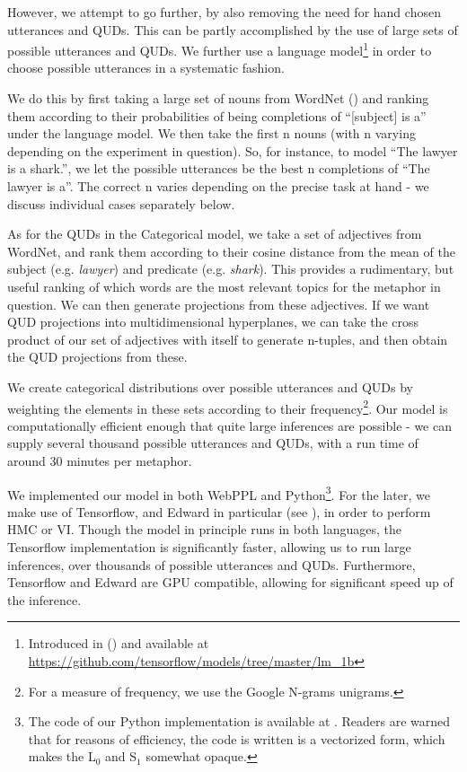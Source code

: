 \documentclass[10pt,letterpaper,twocolumn]{article}
\begin{document}
However, we attempt to go further, by also removing the need for hand chosen utterances and QUDs. This can be partly accomplished by the use of large sets of possible utterances and QUDs. We further use a language model\footnote{Introduced in (\cite{jozefowicz2016exploring}) and available at \url{https://github.com/tensorflow/models/tree/master/lm_1b}} in order to choose possible utterances in a systematic fashion.

We do this by first taking a large set of nouns from WordNet (\cite{miller1995wordnet}) and ranking them according to their probabilities of being completions of ``[subject] is a'' under the language model. We then take the first n nouns (with n varying depending on the experiment in question). So, for instance, to model ``The lawyer is a shark.'', we let the possible utterances be the best n completions of ``The lawyer is a''. The correct n varies depending on the precise task at hand - we discuss individual cases separately below. 

As for the QUDs in the Categorical model, we take a set of adjectives from WordNet, and rank them according to their cosine distance from the mean of the subject (e.g. \emph{lawyer}) and predicate (e.g. \emph{shark}). This provides a rudimentary, but useful ranking of which words are the most relevant topics for the metaphor in question. We can then generate projections from these adjectives. If we want QUD projections into multidimensional hyperplanes, we can take the cross product of our set of adjectives with itself to generate n-tuples, and then obtain the QUD projections from these.

We create categorical distributions over possible utterances and QUDs by weighting the elements in these sets according to their frequency\footnote{For a measure of frequency, we use the Google N-grams unigrams.}. Our model is computationally efficient enough that quite large inferences are possible - we can supply several thousand possible utterances and QUDs, with a run time of around 30 minutes per metaphor. 


We implemented our model in both WebPPL and Python\footnote{The code of our Python implementation is available at \url{}. Readers are warned that for reasons of efficiency, the code is written is a vectorized form, which makes the L$_0$ and S$_1$ somewhat opaque.}. For the later, we make use of Tensorflow, and Edward in particular (see \cite{edward}), in order to perform HMC or VI. Though the model in principle runs in both languages, the Tensorflow implementation is significantly faster, allowing us to run large inferences, over thousands of possible utterances and QUDs. Furthermore, Tensorflow and Edward are GPU compatible, allowing for significant speed up of the inference.
\end{document}
